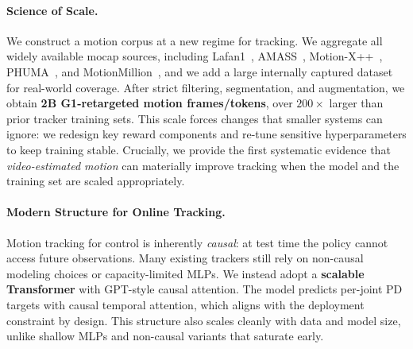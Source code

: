 \paragraph{Science of Scale.}
We construct a motion corpus at a new regime for tracking. We aggregate all widely available mocap sources, including Lafan1~\cite{lafan20}, AMASS~\cite{amass19}, Motion-X++~\cite{motionx++25}, PHUMA~\cite{phuma25}, and MotionMillion~\cite{motionmillion25}, and we add a large internally captured dataset for real-world coverage. After strict filtering, segmentation, and augmentation, we obtain \textbf{2B G1-retargeted motion frames/tokens}, over \textbf{$200\times$} larger than prior tracker training sets. This scale forces changes that smaller systems can ignore: we redesign key reward components and re-tune sensitive hyperparameters to keep training stable. Crucially, we provide the first systematic evidence that \emph{video-estimated motion} can materially improve tracking when the model and the training set are scaled appropriately.

\paragraph{Modern Structure for Online Tracking.}
Motion tracking for control is inherently \emph{causal}: at test time the policy cannot access future observations. Many existing trackers still rely on non-causal modeling choices or capacity-limited MLPs. We instead adopt a \textbf{scalable Transformer} with GPT-style causal attention. The model predicts per-joint PD targets with causal temporal attention, which aligns with the deployment constraint by design. This structure also scales cleanly with data and model size, unlike shallow MLPs and non-causal variants that saturate early.

